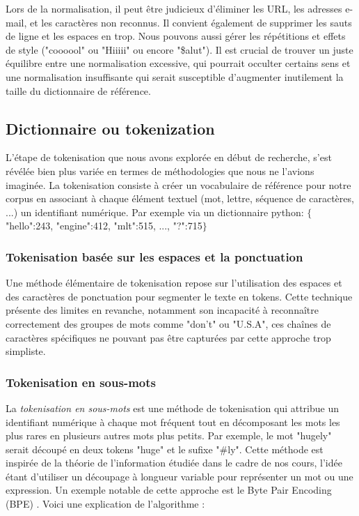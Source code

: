 \documentclass[12pt]{article}
\theoremstyle{definition}
\begin{document}
	 Lors de la normalisation, il peut être judicieux d'éliminer les URL, les adresses e-mail, et les caractères non reconnus. Il convient également de supprimer les sauts de ligne et les espaces en trop. Nous pouvons aussi gérer les répétitions et effets de style ("coooool" ou "Hiiiii" ou encore "\$alut"). Il est crucial de trouver un juste équilibre entre une normalisation excessive, qui pourrait occulter certains sens et une normalisation insuffisante qui serait susceptible d'augmenter inutilement la taille du dictionnaire de référence.
	\subsection{Dictionnaire ou tokenization}
	
	L'étape de tokenisation que nous avons explorée en début de recherche, s'est révélée bien plus variée en termes de méthodologies que nous ne l'avions imaginée. La tokenisation consiste à créer un vocabulaire de référence pour notre corpus en associant à chaque élément textuel (mot, lettre, séquence de caractères, ...) un identifiant numérique. Par exemple via un dictionnaire python: $\{$"hello":243, "engine":412, "mlt":515, ..., "?":715$\}$ 
	

	\subsubsection{Tokenisation basée sur les espaces et la ponctuation}
	Une méthode élémentaire de tokenisation repose sur l'utilisation des espaces et des caractères de ponctuation pour segmenter le texte en tokens. Cette technique présente des limites en revanche, notamment son incapacité à reconnaître correctement des groupes de mots comme "don't" ou "U.S.A", ces chaînes de caractères spécifiques ne pouvant pas être capturées par cette approche trop simpliste.
	
	\subsubsection{Tokenisation en sous-mots}
	
	La \emph{tokenisation en sous-mots} est une méthode de tokenisation qui attribue un identifiant numérique à chaque mot fréquent tout en décomposant les mots les plus rares en plusieurs autres mots plus petits. Par exemple, le mot "hugely" serait découpé en deux tokens "huge" et le sufixe "\#ly". Cette méthode est inspirée de la théorie de l'information étudiée dans le cadre de nos cours, l'idée étant d'utiliser un découpage à longueur variable pour représenter un mot ou une expression. Un exemple notable de cette approche est le Byte Pair Encoding (BPE) \cite{BPE}. Voici une explication de l'algorithme : 
	
\end{document}
